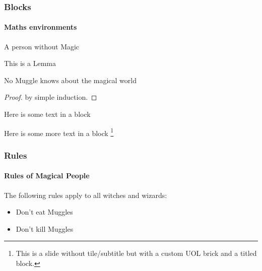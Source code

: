 \documentclass[aspectratio=169]{beamer}
\begin{document}
\begin{frame}
\frametitle{Blocks}
\framesubtitle{Maths environments}

\begin{definition}[Muggle]
A person without Magic
\end{definition}

\begin{lemma}
    This is a Lemma
\end{lemma}
\begin{theorem}
No Muggle knows about the magical world
\end{theorem} 
\begin{proof}
    by simple induction.
\end{proof}

\end{frame}

% 
%
\begin{frame}
    \begin{block}{Here is some text in a block}
      \lipsum[1][1-5]
    \end{block}
\end{frame}

\begin{frame}
    \begin{block}{Here is some more text in a block}
        \lipsum[1][1-5]\footnote{This is a slide without tile/subtitle but with a custom UOL brick and a titled block.}
    \end{block}
\end{frame}

\begin{frame}
\frametitle{Rules}
\framesubtitle{Rules of Magical People}


The following rules apply to all witches and wizards:
\begin{itemize}
\item Don't eat Muggles
\item Don't kill Muggles
\end{itemize}

\end{frame}
\end{document}
